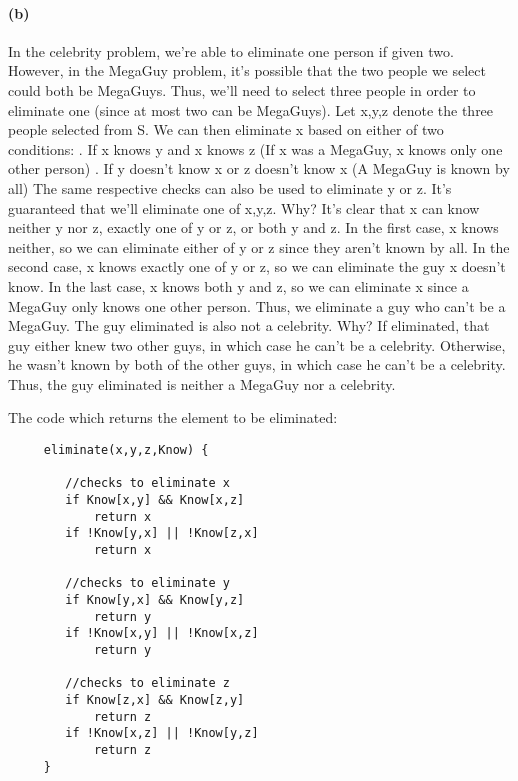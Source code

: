 \documentclass[11pt,a4paper]{article}
\begin{document}
	\paragraph{(b)}
	In the celebrity problem, we're able to eliminate one person if given two. However, in the MegaGuy problem, it's possible that the two people we select could both be MegaGuys. Thus, we'll need to select three people in order to eliminate one (since at most two can be MegaGuys). \newline \newline
	Let x,y,z denote the three people selected from S. We can then eliminate x based on either of two conditions: . If x knows y and x knows z  (If x was a MegaGuy, x knows only one other person) . If y doesn't know x or z doesn't know x (A MegaGuy is known by all) \newline
	The same respective checks can also be used to eliminate y or z. \newline \newline
	 It's guaranteed that we'll eliminate one of x,y,z. Why? It's clear that x can know neither y nor z, exactly one of y or z, or both y and z. In the first case, x knows neither, so we can eliminate either of y or z since they aren't known by all. In the second case, x knows exactly one of y or z, so we can eliminate the guy x doesn't know. In the last case, x knows both y and z, so we can eliminate x since a MegaGuy only knows one other person. Thus, we eliminate a guy who can't be a MegaGuy.\newline 
	The guy eliminated is also not a celebrity. Why? If eliminated, that guy either knew two other guys, in which case he can't be a celebrity. Otherwise, he wasn't known by both of the other guys, in which case he can't be a celebrity. \newline
	 Thus, the guy eliminated is neither a MegaGuy nor a celebrity.
	 
	 The code which returns the element to be eliminated:
	 \lstset{
	 	tabsize=4
	 }
	 \begin{lstlisting}
	 eliminate(x,y,z,Know) {
	 
	 	//checks to eliminate x
	 	if Know[x,y] && Know[x,z] 
	 		return x
	 	if !Know[y,x] || !Know[z,x]
	 		return x
	 	
	 	//checks to eliminate y
	 	if Know[y,x] && Know[y,z] 
	 		return y
	 	if !Know[x,y] || !Know[x,z]
	 		return y
	 		
	 	//checks to eliminate z
	 	if Know[z,x] && Know[z,y] 
	 		return z
	 	if !Know[x,z] || !Know[y,z]
	 		return z
	 }
	 \end{lstlisting}
	 
\end{document}
